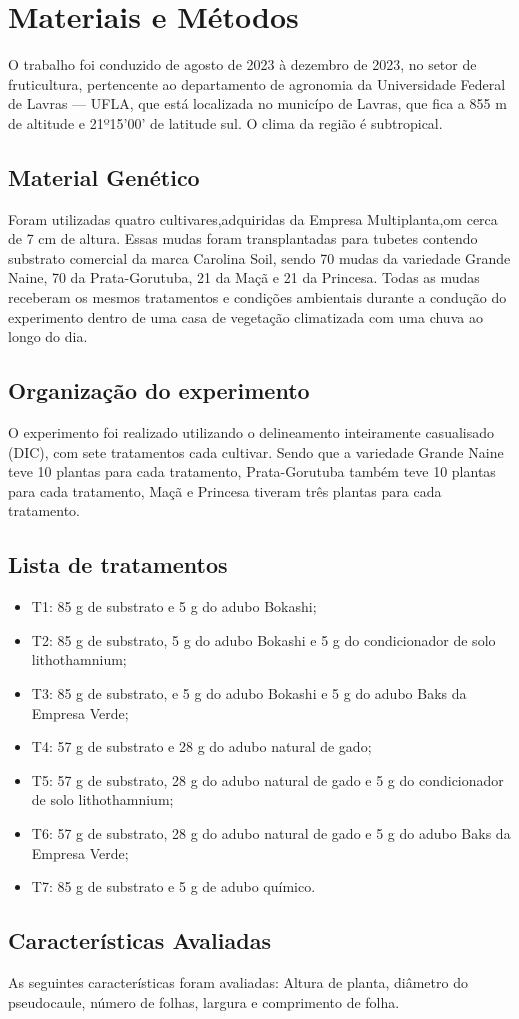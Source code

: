 \chapter{Materiais e Métodos}

O trabalho foi conduzido de agosto de 2023 à dezembro de 2023, no setor de fruticultura, pertencente ao departamento de agronomia da Universidade Federal de Lavras --- UFLA, que está localizada no municípo de Lavras, que fica a 855 \unit{\metre} de altitude e 21º15'00' de latitude sul. O clima da região é subtropical.

\section{Material Genético}
Foram utilizadas quatro cultivares,adquiridas da Empresa Multiplanta,om cerca de 7 \unit{\centi\metre} de altura. Essas mudas foram transplantadas  para tubetes contendo substrato comercial da marca Carolina Soil, sendo 70 mudas da variedade Grande Naine, 70 da Prata-Gorutuba, 21 da Maçã e 21 da Princesa. Todas as mudas receberam os mesmos tratamentos e condições ambientais durante a condução do experimento dentro de uma casa de vegetação climatizada com uma chuva ao longo do dia.

\section{Organização do experimento}
O experimento foi realizado utilizando o delineamento inteiramente casualisado (DIC), com sete tratamentos cada cultivar. Sendo que a variedade Grande Naine teve 10 plantas para cada tratamento, Prata-Gorutuba também teve 10 plantas para cada tratamento, Maçã e Princesa tiveram três plantas para cada tratamento.

\section{Lista de tratamentos}

\begin{itemize}
	\item T1: 85 \unit{\gram} de substrato e 5 \unit{\gram} do adubo Bokashi;
	\item T2: 85 \unit{\gram} de substrato, 5 \unit{\gram} do adubo Bokashi e 5 \unit{\gram} do condicionador de solo lithothamnium;
	\item T3: 85 \unit{\gram} de substrato, e 5 \unit{\gram} do adubo Bokashi e 5 \unit{\gram} do adubo Baks da Empresa Verde;
	\item T4: 57 \unit{\gram} de substrato e 28 \unit{\gram} do adubo natural de gado;
	\item T5: 57 \unit{\gram} de substrato, 28 \unit{\gram} do adubo natural de gado e 5 \unit{\gram} do condicionador de solo lithothamnium;
	\item T6: 57 \unit{\gram} de substrato, 28 \unit{\gram} do adubo natural de gado e 5 \unit{\gram} do adubo Baks da Empresa Verde;
	\item T7: 85 \unit{\gram} de substrato e 5 \unit{\gram} de adubo químico.
\end{itemize}

\section{Características Avaliadas}
As seguintes características foram avaliadas: Altura de planta, diâmetro do pseudocaule, número de folhas, largura e comprimento de folha.
